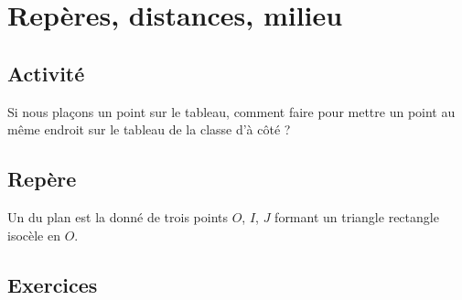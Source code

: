 \section{Repères, distances, milieu}

\subsection{Activité}

Si nous plaçons un point sur le tableau, comment faire pour mettre un point au même endroit sur le tableau de la classe d'à côté ?

\subsection{Repère}

\begin{definition}
    Un  du plan est la donné de trois points \( O\), \( I\), \( J\) formant un triangle rectangle isocèle en  \( O\).
\end{definition}

\subsection{Exercices}



